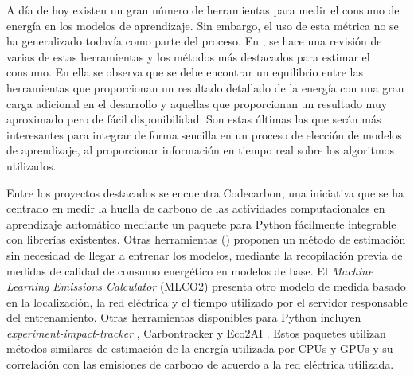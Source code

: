 A día de hoy existen un gran número de herramientas para medir el consumo de energía en los modelos de aprendizaje. Sin embargo, el uso de esta métrica no se ha generalizado todavía como parte del proceso. En \cite{eva2019review}, se hace una revisión de varias de estas herramientas y los métodos más destacados para estimar el consumo. En ella se observa que se debe encontrar un equilibrio entre las herramientas que proporcionan un resultado detallado de la energía con una gran carga adicional en el desarrollo y aquellas que proporcionan un resultado muy aproximado pero de fácil disponibilidad. Son estas últimas las que serán más interesantes para integrar de forma sencilla en un proceso de elección de modelos de aprendizaje, al proporcionar información en tiempo real sobre los algoritmos utilizados.



Entre los proyectos destacados se encuentra Codecarbon\cite{codecarbon}, una iniciativa que se ha centrado en medir la huella de carbono de las actividades computacionales en aprendizaje automático mediante un paquete para Python fácilmente integrable con librerías existentes. Otras herramientas (\cite{getzner2023accuracy}) proponen un método de estimación sin necesidad de llegar a entrenar los modelos, mediante la recopilación previa de medidas de calidad de consumo energético en modelos de base. El \emph{Machine Learning Emissions Calculator} (MLCO2)\cite{lacoste2022mlco2} presenta otro modelo de medida basado en la localización, la red eléctrica y el tiempo utilizado por el servidor responsable del entrenamiento. Otras herramientas disponibles para Python incluyen \emph{experiment-impact-tracker} \cite{henderson2020tracker}, Carbontracker \cite{anthony2020carbontracker} y Eco2AI \cite{budennyy2022eco2ai}. Estos paquetes utilizan métodos similares de estimación de la energía utilizada por CPUs y GPUs y su correlación con las emisiones de carbono de acuerdo a la red eléctrica utilizada.

